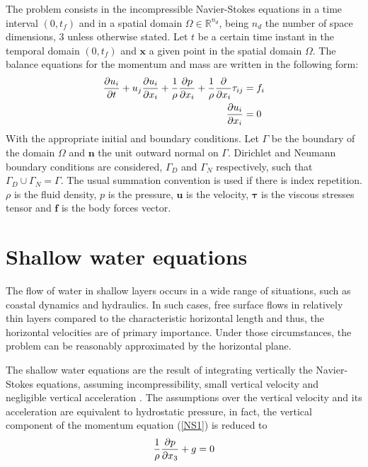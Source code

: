 The problem consists in the incompressible Navier-Stokes equations in a time interval $(0, t_f)$ and in a spatial domain $\Omega \in \mathbb{R}^{n_d}$, being $n_d$ the number of space dimensions, $3$ unless otherwise stated. Let $t$ be a certain time instant in the temporal domain $(0, t_f)$ and $\mathbf{x}$ a given point in the spatial domain $\Omega$. The balance equations for the momentum and mass are written in the following form:
\begin{subequations} \label{NS}
    \begin{align} \label{NS1}
        \frac{\partial u_i}{\partial t} + u_j \frac{\partial u_i}{\partial x_i} + \frac{1}{\rho} \frac{\partial p}{\partial x_i} +
            \frac{1}{\rho} \frac{\partial}{\partial x_i} \tau_{ij} &= f_i \\ \label{NS2}
        \frac{\partial u_i}{\partial x_i} &= 0
    \end{align}
\end{subequations}
With the appropriate initial and boundary conditions. Let $\Gamma$ be the boundary of the domain $\Omega$ and $\mathbf{n}$ the unit outward normal on $\Gamma$. Dirichlet and Neumann boundary conditions are considered, $\Gamma_D$ and $\Gamma_N$ respectively, such that $\Gamma_D \cup \Gamma_N = \Gamma$.
The usual summation convention is used if there is index repetition.
$\rho$ is the fluid density, $p$ is the pressure, $\mathbf{u}$ is the velocity, $\bm{\tau}$ is the viscous stresses tensor and $\mathbf{f}$ is the body forces vector.








\section{Shallow water equations}
\label{equations_sw}


The flow of water in shallow layers occurs in a wide range of situations, such as coastal dynamics and hydraulics. In such cases, free surface flows in relatively thin layers compared to the characteristic horizontal length and thus, the horizontal velocities are of primary importance. Under those circumstances, the problem can be reasonably approximated by the horizontal plane.

The shallow water equations are the result of integrating vertically the Navier-Stokes equations, assuming incompressibility, small vertical velocity and negligible vertical acceleration \cite{abbott1979,zien3}. The assumptions over the vertical velocity and its acceleration are equivalent to hydrostatic pressure, in fact, the vertical component of the momentum equation (\ref{NS1}) is reduced to
\begin{equation} \label{SW_hydrostatic_pressure}
    \frac{1}{\rho}\frac{\partial p}{\partial x_3} + g = 0
\end{equation}

